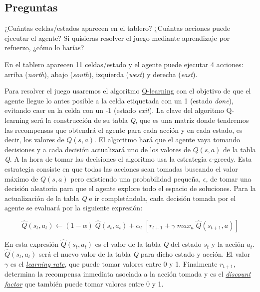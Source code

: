\documentclass[11pt]{exam}
\begin{document}
\subsection*{Preguntas}

\begin{questions}
	
{ \question ¿Cuántas celdas/estados aparecen en el tablero? ¿Cuántas acciones puede ejecutar el agente? Si quisieras resolver el juego mediante aprendizaje por refuerzo, ¿cómo lo harías?\label{pregunta_1} 
}

En el tablero aparecen 11 celdas/estado y el agente puede ejecutar 4 acciones: arriba (\textit{north}), abajo (\textit{south}), izquierda (\textit{west}) y derecha (\textit{east}).

Para resolver el juego usaremos el algoritmo \href{https://en.wikipedia.org/wiki/Q-learning}{Q-learning} con el objetivo de que el agente llegue lo antes posible a la celda etiquetada con un 1 (estado \textit{done}), evitando caer en la celda con un -1 (estado \textit{exit}). La clave del algoritmo Q-learning será la construcción de su tabla \textit{Q}, que es una matriz donde tendremos las recompensas que obtendrá el agente para cada acción y en cada estado, es decir, los valores de $Q(s,a)$. El algoritmo hará que el agente vaya tomando decisiones y a cada decisión actualizará uno de los valores de $Q(s,a)$ de la tabla \textit{Q}. A la hora de tomar las decisiones el algoritmo usa la estrategia \textit{$\epsilon$}-greedy. Esta estrategia consiste en que todas las acciones sean tomadas buscando el valor máximo de $Q(s,a)$ pero existiendo una probabilidad pequeña, \textit{$\epsilon$}, de tomar una decisión aleatoria para que el agente explore todo el espacio de soluciones. Para la actualización de la tabla \textit{Q} e ir completándola, cada decisión tomada por el agente se evaluará por la siguiente expresión:

\begin{equation}
	\hat{Q}(s_{t}, a_{t}) \leftarrow (1-\alpha) \; \hat{Q}(s_{t}, a_{t}) + \alpha_{t} \; [r_{t+1} + \gamma \; max_{a} \; \hat{Q}(s_{t + 1}, a)]
\end{equation}

En esta expresión $\hat{Q}(s_{t}, a_{t})$ es el valor de la tabla \textit{Q} del estado $s_{t}$ y la acción $ a_{t}$. $\hat{Q}(s_{t}, a_{t})$ será el nuevo valor de la tabla \textit{Q} para dicho estado y acción. El valor $\gamma$ es el \href{https://en.wikipedia.org/wiki/Learning_rate}{\textit{learning rate}}, que puede tomar valores entre 0 y 1. Finalmente $r_{t+1}$, determina la recompensa inmediata asociada a la acción tomada y es el \href{https://en.wikipedia.org/wiki/Discounting#Discount_factor}{\textit{discount factor}} que también puede tomar valores entre 0 y 1.


\end{questions}
\end{document}
